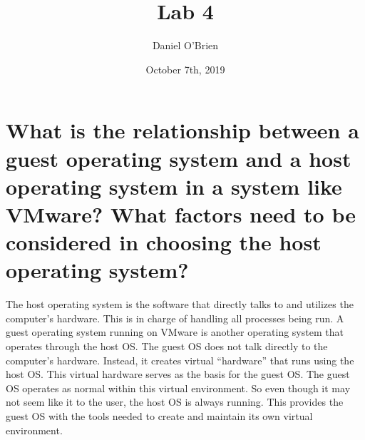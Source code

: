 \documentclass{article}
\title{Lab 4}
\author{Daniel O'Brien}
\date{October 7th, 2019}
\begin{document}
\maketitle

\section{What is the relationship between a guest operating system and a host operating system in a system like VMware? What factors need to be considered in choosing the host operating system?}

The host operating system is the software that directly talks to and utilizes the computer’s hardware. This is in charge of handling all processes being run. A guest operating system running on VMware is another operating system that operates through the host OS. The guest OS does not talk directly to the computer’s hardware. Instead, it creates virtual “hardware” that runs using the host OS. This virtual hardware serves as the basis for the guest OS. The guest OS operates as normal within this virtual environment. So even though it may not seem like it to the user, the host OS is always running. This provides the guest OS with the tools needed to create and maintain its own virtual environment. 
\end{document}
